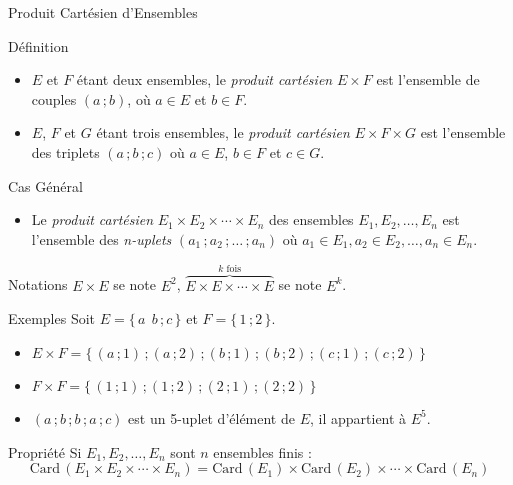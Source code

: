 \documentclass{cours}
\begin{document}
    \begin{Gpartie}{Produit Cartésien d'Ensembles}
        \begin{Spartie}{Définition}
            \begin{itemize}
                \item $E$ et $F$ étant deux ensembles, le \emph{produit cartésien} $E\times F$ est l'ensemble de couples $(a\,; b)$, où $a\in E$ et $b\in F$.
                \item $E$, $F$ et $G$ étant trois ensembles, le \emph{produit cartésien} $E\times F\times G$ est l'ensemble des triplets $(a\,; b\,; c)$ où $a\in E$, $b\in F$ et $c\in G$.
            \end{itemize}
            \begin{SSpartie}{Cas Général}
                \begin{itemize}
                    \item Le \emph{produit cartésien} $E_1\times E_2\times\dotsb\times E_n$ des ensembles $E_1, E_2,\dotsc,E_n$ est l'ensemble des \emph{n-uplets} $(a_1\,; a_2\,;\dotsc\,; a_n)$ où $a_1\in E_1,a_2\in E_2,\dotsc,a_n\in E_n$.
                \end{itemize}
            \end{SSpartie}
        \end{Spartie}
        \begin{Spartie}{Notations}
            $E\times E$ se note $E^2$, $\overbrace{E\times E\times\dotsb\times E}^\text{$k$ fois}$ se note $E^k$.
        \end{Spartie}
        \begin{Spartie}{Exemples}
            Soit $E=\big\{\, a\;\, b\,; c\,\big\}$ et $F=\big\{\,1\,; 2\,\big\}$.
            \begin{itemize}
                \item $E\times F=\big\{\,(a\,; 1)\,;(a\,; 2)\,; (b\,; 1)\,; (b\,; 2)\,; (c\,; 1)\,; (c\,; 2)\,\big\}$
                \item $F\times F=\big\{\,(1\,; 1)\,; (1\,; 2)\,; (2\,; 1)\,; (2\,; 2)\,\big\}$
                \item $(a\,; b\,; b\,; a\,; c)$ est un 5-uplet d'élément de $E$, il appartient à $E^5$.
            \end{itemize}
        \end{Spartie}
        \begin{Spartie}{Propriété}
            Si $E_1,E_2,\dotsc,E_n$ sont $n$ ensembles finis :
            \[\mathrm{Card}\,(E_1\times E_2\times\dotsb\times E_n)=\mathrm{Card}\,(E_1)\times\mathrm{Card}\,(E_2)\times\dotsb\times\mathrm{Card}\,(E_n)\]

\end{Spartie}
\end{Gpartie}
\end{document}
